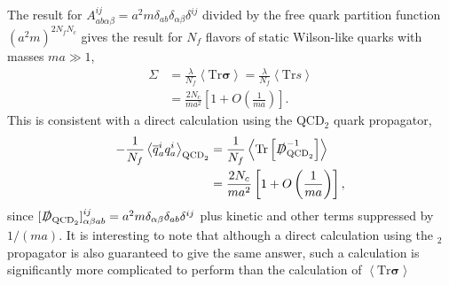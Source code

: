 \documentclass[%
    twocolumn,
superscriptaddress,
preprintnumbers,
nofootinbib,
 amsmath,amssymb,
 aps,
 prd,
 floatfix,
]{revtex4-2}
\newcommand{\qcd}[0]{\text{QCD}}
\newcommand{\txqcd}[0]{\text{TXQCD}}
\begin{document}
The result for $A_{ab\alpha\beta}^{ij} = a^2 m \delta_{ab}\delta_{\alpha\beta}\delta^{ij}$ divided by the free quark partition function $(a^2 m)^{2N_f N_c}$ gives the result for $N_f$ flavors of static Wilson-like quarks with masses $m a \gg 1$,
\begin{equation}
  \begin{split}
    \Sigma &= \frac{\lambda}{N_f}\left< \text{Tr}\bm{\sigma} \right> = \frac{\lambda}{N_f} \left< \text{Tr}s \right> \\
    &= \frac{2 N_c}{m a^2} \left[ 1 + O\left(\frac{1}{m a}\right) \right].
  \end{split}
\end{equation}
This is consistent with a direct calculation using the QCD$_2$ quark propagator,
\begin{equation}
  \begin{split}
    -\frac{1}{N_f}\left< \overline{q}^i_a q^i_a \right>_{\qcd_2} &= \frac{1}{N_f} \left< \text{Tr}\left[ \slashed{D}_{\qcd_2}^{-1} \right] \right> \\
    &= \frac{2 N_c}{m a^2} \left[ 1 + O\left(\frac{1}{m a}\right) \right],
  \end{split}
\end{equation}
since $[\slashed{D}_{\qcd_2}]_{\alpha\beta ab}^{ij} = a^2 m \delta_{\alpha\beta}\delta_{ab}\delta^{ij}$ plus kinetic and other terms suppressed by $1/(ma)$.
It is interesting to note that although a direct calculation using the \txqcd$_2$ propagator is also guaranteed to give the same answer, such a calculation is significantly more complicated to perform than the calculation of $\left< \text{Tr}\bm{\sigma} \right>$
\end{document}
